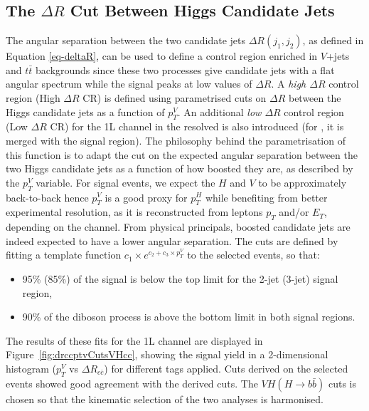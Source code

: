 \subsection{The $\Delta R$ Cut Between Higgs Candidate Jets}\label{ap-sec-vh-deltaR}
The angular separation between the two candidate jets $\Delta R(j_1, j_2)$, as defined in Equation \ref{eq-deltaR}, can be used to define a control region enriched in $V$+jets and $t\bar{t}$ backgrounds since these two processes give candidate jets with a flat angular spectrum while the signal peaks at low values of $\Delta R$. A \textit{high $\Delta R$} control region (High $\Delta R$ CR) is defined using parametrised cuts on $\Delta R$ between the Higgs candidate jets as a function of $p_T^V$. An additional \textit{low $\Delta R$} control region (Low $\Delta R$ CR) for the 1L channel in the resolved \vhb is also introduced (for \vhc, it is merged with the signal region). The philosophy behind the parametrisation of this function is to adapt the cut on the expected angular separation between the two Higgs candidate jets as a function of how boosted they are, as described by the $p_T^V$ variable. For signal events, we expect the $H$ and $V$ to be approximately back-to-back hence $p_T^V$ is a good proxy for $p_T^H$ while benefiting from better experimental resolution, as it is reconstructed from leptons $p_T$ and/or $E_T$, depending on the channel. From physical principals, boosted candidate jets are indeed expected to have a lower angular separation. The cuts are defined by fitting a template function $ c_1 \times e^{c_2 + c_3 \times p_T^V}$ to the \vhb selected events, so that:   
\begin{itemize}
\item 95\% (85\%) of the \vhb signal is below the top limit for the 2-jet (3-jet) signal region,
\item 90\% of the diboson process is above the bottom limit in both signal regions.
\end{itemize}

The results of these fits for the 1L channel are displayed in Figure~\ref{fig:drccptvCutsVHcc}, showing the signal yield in a 2-dimensional histogram ($p_T^V$ vs $\Delta R_{c\bar{c}}$) for different tags applied. Cuts derived on the \vhc selected events showed good agreement with the \vhb derived cuts. The $VH(H\rightarrow b\bar{b})$ cuts is chosen so that the kinematic selection of the two analyses is harmonised. \\

